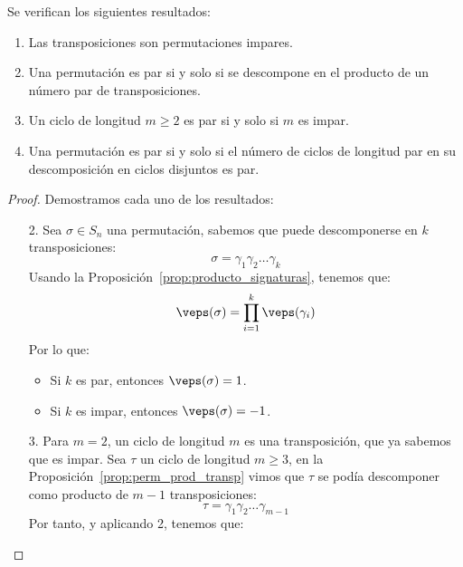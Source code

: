 \begin{coro}
    Se verifican los siguientes resultados:
    \begin{enumerate}
        \item Las transposiciones son permutaciones impares.
        \item Una permutación es par si y solo si se descompone en el producto de un número par de transposiciones.
        \item Un ciclo de longitud $m\geq 2$ es par si y solo si $m$ es impar.
        \item Una permutación es par si y solo si el número de ciclos de longitud par en su descomposición en ciclos disjuntos es par.
    \end{enumerate}
    \begin{proof}
        Demostramos cada uno de los resultados:
        \begin{enumerate}
            \item[2.] Sea $\sigma\in S_n$ una permutación, sabemos que puede descomponerse en $k$ transposiciones:
                \begin{equation*}
                    \sigma = \gamma_1\gamma_2\ldots\gamma_k
                \end{equation*}
                Usando la Proposición~\ref{prop:producto_signaturas}, tenemos que:
                \begin{equation*}
                    \veps(\sigma) = \prod_{i=1}^{k}\veps(\gamma_i)
                \end{equation*}
                Por lo que:
                \begin{itemize}
                    \item Si $k$ es par, entonces $\veps(\sigma)=1$.
                    \item Si $k$ es impar, entonces $\veps(\sigma)=-1$.
                \end{itemize}
            \item[3.] Para $m=2$, un ciclo de longitud $m$ es una transposición, que ya sabemos que es impar. Sea $\tau$ un ciclo de longitud $m\geq 3$, en la Proposición~\ref{prop:perm_prod_transp} vimos que $\tau$ se podía descomponer como producto de $m-1$ transposiciones:
                \begin{equation*}
                    \tau = \gamma_1\gamma_2\ldots \gamma_{m-1}
                \end{equation*}
                Por tanto, y aplicando 2, tenemos que:

\end{enumerate}
\end{proof}
\end{coro}
